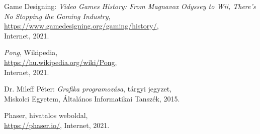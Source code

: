 \begin{thebibliography}{x}
	Game Designing: \emph{Video Games History: From Magnavox Odyssey to Wii, There’s No Stopping the Gaming Industry}, \\
	\url{https://www.gamedesigning.org/gaming/history/}, \\
	Internet, 2021.
	
	\emph{Pong}, Wikipedia, \\
	\url{https://hu.wikipedia.org/wiki/Pong}, \\
	Internet, 2021.
	
	
	
	
	
	
	
	
	Dr. Mileff Péter: \emph{Grafika programozása}, tárgyi jegyzet, \\
	Miskolci Egyetem, Általános Informatikai Tanszék, 2015.
	
	Phaser, hivatalos weboldal, \\
	\url{https://phaser.io/},
	Internet, 2021.


\end{thebibliography}

